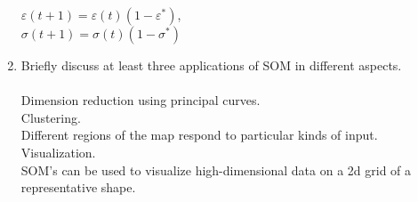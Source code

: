 \documentclass{article}
\begin{document}
\begin{enumerate}
        $\varepsilon(t+1) = \varepsilon(t) (1 - \varepsilon^*)$, \\
	$\sigma(t+1) = \sigma(t) (1 - \sigma^*)$
    \item  Briefly discuss at least three applications of SOM in different aspects.\\
        \\
        Dimension reduction using principal curves. \\
        Clustering. \\
        Different regions of the map respond to particular kinds of input.\\
        Visualization. \\
        SOM's can be used to visualize high-dimensional data on a 2d grid of a representative shape.
\end{enumerate}
\end{document}
